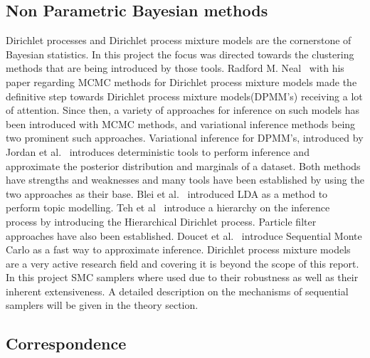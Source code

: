 \documentclass[twoside,hidelinks]{article}
\begin{document}
\subsection{Non Parametric Bayesian methods}

Dirichlet processes and Dirichlet process mixture models are the cornerstone of Bayesian statistics. In this project the focus was directed towards the clustering methods that are being introduced by those tools. Radford M. Neal~\cite{bayes:neal} with his paper regarding MCMC methods for Dirichlet process mixture models made the definitive step towards Dirichlet process mixture models(DPMM's) receiving a lot of attention. Since then, a variety of approaches for inference on such models has been introduced with MCMC methods, and variational inference methods being two prominent such approaches. Variational inference for DPMM's, introduced by Jordan et al.~\cite{bayes:jordan} introduces deterministic tools to perform inference and approximate the posterior distribution and marginals of a dataset. Both methods have strengths and weaknesses and many tools have been established by using the two approaches as their base. Blei et al.~\cite{LDA} introduced LDA as a method to perform topic modelling. Teh et al~\cite{bayes:hier} introduce a hierarchy on the inference process by introducing the Hierarchical Dirichlet process. Particle filter approaches have also been established. Doucet et al.~\cite{bayes:smc} introduce Sequential Monte Carlo as a fast way to approximate inference. Dirichlet process mixture models are a very active research field and covering it is beyond the scope of this report. In this project SMC samplers where used due to their robustness as well as their inherent extensiveness. A detailed description on the mechanisms of sequential samplers will be given in the theory section.

\subsection{Correspondence}
\end{document}
